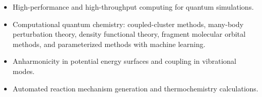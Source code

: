 \begin{itemize}
    \item High-performance and high-throughput computing for quantum simulations.
    \item Computational quantum chemistry: coupled-cluster methods, many-body perturbation theory, density functional theory, fragment molecular orbital methods, and parameterized methods with machine learning.
    \item Anharmonicity in potential energy surfaces and coupling in vibrational modes.
    \item Automated reaction mechanism generation and thermochemistry calculations.

\end{itemize}
